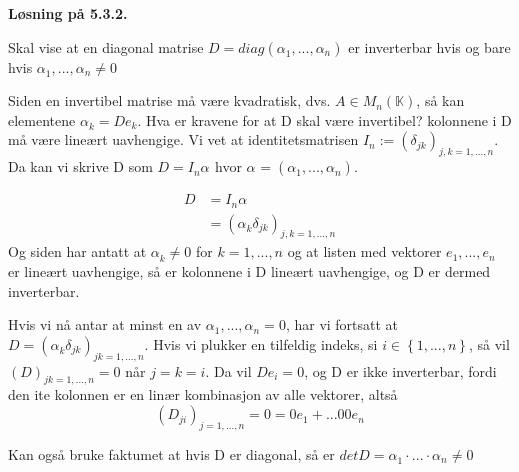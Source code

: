 \documentclass[a4paper,norsk]{article}
\newenvironment{oppgave}[1]%
	{\trivlist{}\item\relax\textbf{Løsning på #1.}\medspace}%
	{\endtrivlist}
\begin{document}
\begin{oppgave}{5.3.2}

Skal vise at en diagonal matrise $ D = diag \left( \alpha_{1}^{} , ..., \alpha_{n}^{}  \right)  $ er inverterbar hvis og bare hvis $ \alpha_{1}^{}, ..., \alpha_{n}^{} \neq 0 $ 

Siden en invertibel matrise må være kvadratisk, dvs. $ A \in M_n( \mathbb{K}) $, så kan elementene $ \alpha_{k}^{}   = De_k$. Hva er kravene for at D skal være invertibel? kolonnene i D må være lineært uavhengige. Vi vet at identitetsmatrisen $ I_n := (\delta_{jk})_{j, k =1, ..., n} $. Da kan vi skrive D som $ D = I_n \alpha_{}^{}  $ hvor $ \alpha_{}^{} = \left( \alpha_{1}^{}, ..., \alpha_{n}^{}  \right)  $. 

\begin{align*}
    D &= I_n \alpha_{}^{}\\
    &= \left( \alpha_{k}^{} \delta_{jk} \right)_{j, k = 1, ..., n}  
\end{align*}
Og siden har antatt at $ \alpha_{k}^{} \neq 0  $ for $ k=1, ..., n$ og at listen med vektorer $ e_1, ..., e_n $ er lineært uavhengige, så er kolonnene i D lineært uavhengige, og D er dermed inverterbar.


Hvis vi nå antar at minst en av $ \alpha_{1}^{}, ..., \alpha_{n}^{} =0 $, har vi fortsatt at $ D = \left( \alpha_{k}^{} \delta_{jk} \right)_{jk=1,...,n} $. Hvis vi plukker en tilfeldig indeks, si $ i \in \left\{ 1, ..., n \right\}  $, så vil $ \left( D \right)_{jk=1,...,n} = 0  $ når $ j=k= i$. Da vil $ De_i = 0 $, og D er ikke inverterbar, fordi den ite kolonnen er en linær kombinasjon av alle vektorer, altså 
\[
    (D_{ji})_{j=1,..., n} = 0 = 0e_1 + ... 0 0e_n    
\]

Kan også bruke faktumet at hvis D er diagonal, så er $ detD = \alpha_{1}^{} \cdot ... \cdot \alpha_{n}^{} \neq 0  $ 

\end{oppgave}
\end{document}
